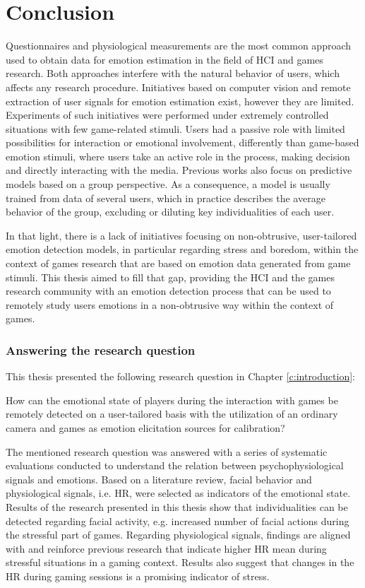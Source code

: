 \chapter{Conclusion}
\label{ch:conclusion}

Questionnaires and physiological measurements are the most common approach used to obtain data for emotion estimation in the field of HCI and games research. Both approaches interfere with the natural behavior of users, which affects any research procedure. Initiatives based on computer vision and remote extraction of user signals for emotion estimation exist, however they are limited. Experiments of such initiatives were performed under extremely controlled situations with few game-related stimuli. Users had a passive role with limited possibilities for interaction or emotional involvement, differently than game-based emotion stimuli, where users take an active role in the process, making decision and directly interacting with the media. Previous works also focus on predictive models based on a group perspective. As a consequence, a model is usually trained from data of several users, which in practice describes the average behavior of the group, excluding or diluting key individualities of each user.

In that light, there is a lack of initiatives focusing on non-obtrusive, user-tailored emotion detection models, in particular regarding stress and boredom, within the context of games research that are based on emotion data generated from game stimuli. This thesis aimed to fill that gap, providing the HCI and the games research community with an emotion detection process that can be used to remotely study users emotions in a non-obtrusive way within the context of games.

\subsection{Answering the research question}

This thesis presented the following research question in Chapter \ref{c:introduction}:

\begin{fquote}
How can the emotional state of players during the interaction with games be remotely detected on a user-tailored basis with the utilization of an ordinary camera and games as emotion elicitation sources for calibration?
\end{fquote}

The mentioned research question was answered with a series of systematic evaluations conducted to understand the relation between psychophysiological signals and emotions. Based on a literature review, facial behavior and physiological signals, i.e. HR, were selected as indicators of the emotional state. Results of the research presented in this thesis show that individualities can be detected regarding facial activity, e.g. increased number of facial actions during the stressful part of games. Regarding physiological signals, findings are aligned with and reinforce previous research that indicate higher HR mean during stressful situations in a gaming context. Results also suggest that changes in the HR during gaming sessions is a promising indicator of stress.

